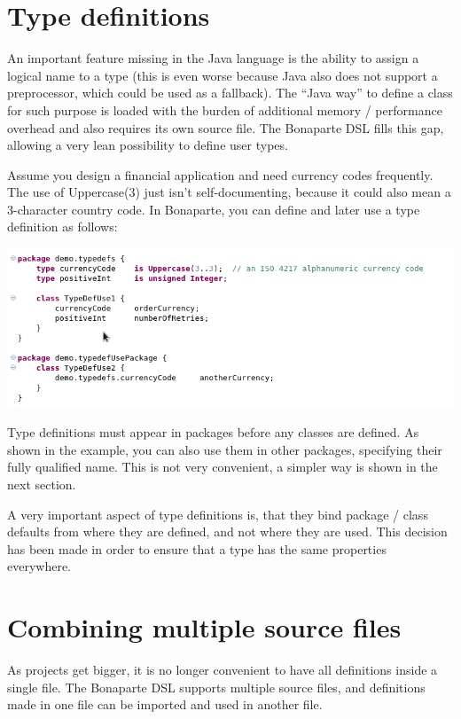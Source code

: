 \documentclass[11pt,a4paper,oneside]{article}
\begin{document}
\section{Type definitions}
An important feature missing in the Java language is the ability to assign a logical name to a type (this is even worse because Java also does not support a preprocessor,
which could be used as a fallback). The ``Java way'' to define a class for such purpose is loaded with the burden of additional memory / performance overhead
and also requires its own source file. The Bonaparte DSL fills this gap, allowing a very lean possibility to define user types.

Assume you design a financial application and need currency codes frequently. The use of {\ttfamily Uppercase(3)} just isn't self-documenting, because it could
also mean a 3-character country code.
In Bonaparte, you can define and later use a type definition as follows:

\vspace{2mm}

\hspace{1cm}\includegraphics[scale=0.5]{images/tut1-010-typedefs.png}

\noindent
Type definitions must appear in packages before any classes are defined. As shown in the example, you can also use them in other packages,
specifying their fully qualified name. This is not very convenient, a simpler way is shown in the next section.

A very important aspect of type definitions is, that they bind package / class defaults from where they are defined, and not where they are used.
This decision has been made in order to ensure that a type has the same properties everywhere.


\section{Combining multiple source files}
As projects get bigger, it is no longer convenient to have all definitions inside a single file.
The Bonaparte DSL supports multiple source files, and definitions made in one file can be imported and used in another file.
\end{document}
